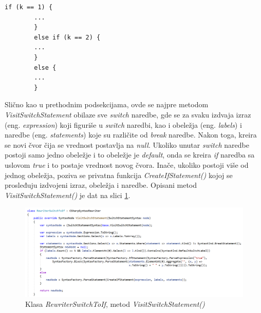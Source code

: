 \documentclass[a4paper]{article}
\begin{document}
{\begin{lstlisting}[caption={If-else naredba}, label=lst:ifelse]
		if (k == 1) {
		...
		}
		else if (k == 2) {
		...
		}
		else {
		...
		}
		\end{lstlisting}
		
		
		Slično kao u prethodnim podsekcijama, ovde se najpre metodom \textit{VisitSwitchStatement} obilaze sve \textit{switch} naredbe, gde se za svaku izdvaja izraz (eng. \textit{expression}) koji figuriše u \textit{switch} naredbi, kao i obeležja (eng. \textit{labels}) i naredbe (eng. \textit{statements}) koje su različite od \textit{break} naredbe. Nakon toga, kreira se novi čvor čija se vrednost postavlja na \textit{null}. Ukoliko unutar \textit{switch} naredbe postoji samo jedno obeležje i to obeležje je \textit{default}, onda se kreira \textit{if} naredba sa uslovom \textit{true} i to postaje vrednost novog čvora.
		Inače, ukoliko postoji više od jednog obeležja, poziva se privatna funkcija \textit{CreateIfStatement()} kojoj se prosleđuju izdvojeni izraz, obeležja i naredbe. Opisani metod \textit{VisitSwitchStatement()} je dat na slici \ref{fig:RewriterSwitchToIf_part1}.
		
		
		\begin{figure}[!htb]
			\begin{center}
				\includegraphics[scale=0.44]{images/RewriterSwitchToIf_part1.png}
			\end{center}
			\caption{Klasa \textit{RewriterSwitchToIf}, metod \textit{VisitSwitchStatement()}}
			\label{fig:RewriterSwitchToIf_part1}
		\end{figure}
		
}
\end{document}
